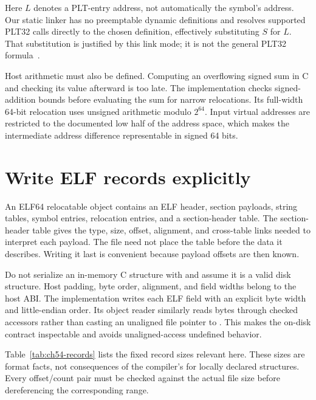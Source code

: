Here $L$ denotes a PLT-entry address, not automatically the symbol's address.
Our static linker has no preemptable dynamic definitions and resolves supported PLT32 calls directly to the chosen definition, effectively substituting $S$ for $L$.
That substitution is justified by this link mode; it is not the general PLT32 formula~\cite{matz-2012-amd64}.

Host arithmetic must also be defined.
Computing an overflowing signed sum in C and checking its value afterward is too late.
The implementation checks signed-addition bounds before evaluating the sum for narrow relocations.
Its full-width 64-bit relocation uses unsigned arithmetic modulo $2^{64}$.
Input virtual addresses are restricted to the documented low half of the address space, which makes the intermediate address difference representable in signed 64 bits.

\section{Write ELF records explicitly}
\label{sec:ch54-elf}

An ELF64 relocatable object contains an ELF header, section payloads, string tables, symbol entries, relocation entries, and a section-header table.
The section-header table gives the type, size, offset, alignment, and cross-table links needed to interpret each payload.
The file need not place the table before the data it describes.
Writing it last is convenient because payload offsets are then known.

Do not serialize an in-memory C structure with  and assume it is a valid disk structure.
Host padding, byte order, alignment, and field widths belong to the host ABI.
The implementation writes each ELF field with an explicit byte width and little-endian order.
Its object reader similarly reads bytes through checked accessors rather than casting an unaligned file pointer to .
This makes the on-disk contract inspectable and avoids unaligned-access undefined behavior.

Table~\ref{tab:ch54-records} lists the fixed record sizes relevant here.
These sizes are format facts, not consequences of the compiler's  for locally declared structures.
Every offset/count pair must be checked against the actual file size before dereferencing the corresponding range.

